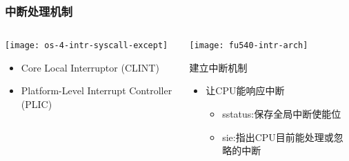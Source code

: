 \begin{frame}[plain,t]
	\frametitle{中断处理机制}
	\begin{columns}
		
		\begin{column}{0.45\textwidth}
			\centering
			\texttt{[image: os-4-intr-syscall-except]}
			\begin{itemize} \small
				\item Core Local	Interruptor (CLINT)
				\item Platform-Level Interrupt Controller (PLIC)
			\end{itemize}
			
		\end{column}
		
		\begin{column}{0.5\textwidth}
			
			\texttt{[image: fu540-intr-arch]}	
			
			建立中断机制
			\begin{itemize}
				\item 让CPU能响应中断 \pause
					\begin{itemize}
						\item sstatus:保存全局中断使能位	 \pause
						\item sie:指出CPU目前能处理或忽略的中断 \pause
					\end{itemize}		
			\end{itemize}		
			
		\end{column}
		
	\end{columns}
	
\end{frame}




